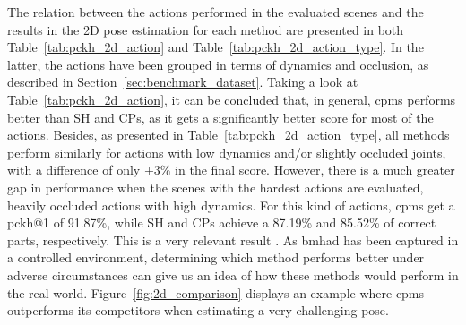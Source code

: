 The relation between the actions performed in the evaluated scenes and the results in the 2D pose estimation for each method are presented in both Table~\ref{tab:pckh_2d_action} and Table~\ref{tab:pckh_2d_action_type}. In the latter, the actions have been grouped in terms of dynamics and occlusion, as described in Section~\ref{sec:benchmark_dataset}. Taking a look at Table~\ref{tab:pckh_2d_action}, it can be concluded that, in general, \glspl{cpm} performs better than SH and CPs, as it gets a significantly better score for most of the actions. Besides, as presented in Table~\ref{tab:pckh_2d_action_type}, all methods perform similarly for actions with low dynamics and/or slightly occluded joints, with a difference of only $\pm3\%$ in the final score. However, there is a much greater gap in performance when the scenes with the hardest actions are evaluated, \ie heavily occluded actions with high dynamics. For this kind of actions, \glspl{cpm} get a \gls{pckh}@1 of 91.87\%, while SH and CPs achieve a 87.19\% and 85.52\% of correct parts, respectively. This is a very relevant result . As \gls{bmhad} has been captured in a controlled environment, determining which method performs better under adverse circumstances can give us an idea of how these methods would perform in the real world. Figure~\ref{fig:2d_comparison} displays an example where \glspl{cpm} outperforms its competitors when estimating a very challenging pose.

